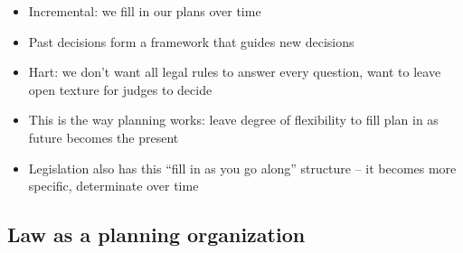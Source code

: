 \begin{itemize}
  \begin{itemize}
  \tightlist
  \item
    Incremental: we fill in our plans over time
  \item
    Past decisions form a framework that guides new decisions
  \item
    Hart: we don't want all legal rules to answer every question, want
    to leave open texture for judges to decide
  \item
    This is the way planning works: leave degree of flexibility to fill
    plan in as future becomes the present
  \item
    Legislation also has this ``fill in as you go along'' structure --
    it becomes more specific, determinate over time
  \end{itemize}
\end{itemize}

\hypertarget{law-as-a-planning-organization}{%
\subsection{Law as a planning
organization}\label{law-as-a-planning-organization}}

